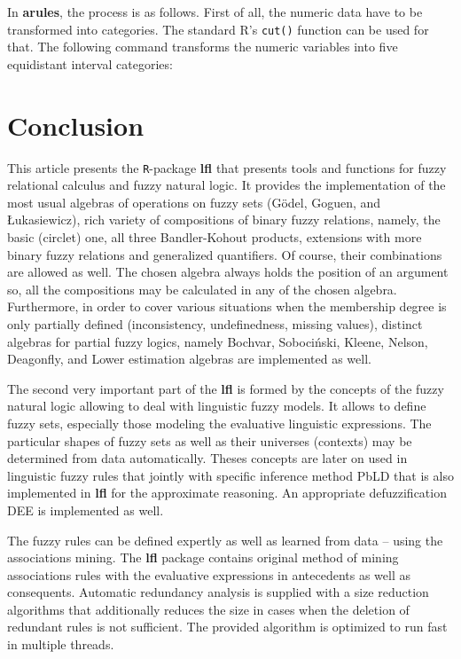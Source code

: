 \documentclass[review]{elsarticle}
\newcommand{\pkg}[1]{\textbf{#1}}
\newcommand{\proglang}[1]{#1}
\newcommand{\code}[1]{\texttt{#1}}
\newcommand{\R}{\proglang{R}}
\begin{document}
In \pkg{arules}, the process is as follows. First of all, the numeric data have to be transformed into categories. The standard \R{}'s \texttt{cut()} function can be used for that. The following command transforms the numeric variables into five equidistant interval categories:
%

%



\section{Conclusion}
\label{sec:conclusion}

This article presents the \code{R}-package \pkg{lfl} that presents tools and functions for fuzzy relational calculus and fuzzy natural logic. It provides the implementation of the most usual algebras of operations on fuzzy sets (G\"{o}del, Goguen, and \L ukasiewicz), rich variety of compositions of binary fuzzy relations, namely, the basic (circlet) one, all three Bandler-Kohout products, extensions with more binary fuzzy relations and generalized quantifiers. Of course, their combinations are allowed as well. The chosen algebra always holds the position of an argument so, all the compositions may be calculated in any of the chosen algebra. Furthermore, in order to cover various situations when the membership degree is only partially defined  (inconsistency, undefinedness, missing values), distinct algebras for partial fuzzy logics, namely Bochvar, Soboci\'{n}ski, Kleene, Nelson, Deagonfly, and Lower estimation algebras are implemented as well.  

 The second very important part of the \pkg{lfl} is formed by the concepts of the fuzzy natural logic allowing to deal with linguistic fuzzy models. It allows to define fuzzy sets, especially those modeling the evaluative linguistic expressions. The particular shapes of fuzzy sets as well as their universes (contexts) may be determined from data automatically. Theses concepts are later on used in linguistic fuzzy rules that jointly with specific inference method PbLD that is also implemented in \pkg{lfl} for the approximate reasoning. An appropriate defuzzification DEE is implemented as well. 
 
 The fuzzy rules can be defined expertly as well as learned from data -- using the associations mining. The \pkg{lfl} package contains original method of mining associations rules with the evaluative expressions in antecedents as well as consequents. Automatic redundancy analysis is supplied with a size reduction algorithms that additionally reduces the size in cases when the deletion of redundant rules is not sufficient. The provided algorithm is optimized to run fast in multiple threads.
 
\end{document}
